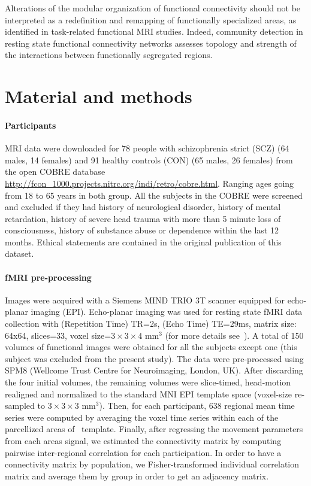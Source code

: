 Alterations of the modular organization of functional connectivity should not be interpreted as a redefinition and remapping of functionally specialized areas, as identified in task-related functional MRI studies.
Indeed, community detection in resting state functional connectivity networks assesses topology and strength of the interactions between functionally segregated regions.

\section{Material and methods}
\paragraph{Participants}

MRI data were downloaded for 78 people with schizophrenia strict (SCZ) (64 males, 14 females) and 91 healthy controls (CON) (65 males, 26 females) from the open COBRE database \url{http://fcon_1000.projects.nitrc.org/indi/retro/cobre.html}.
Ranging ages going from 18 to 65 years in both group.
All the subjects in the COBRE were screened and excluded if they had history of neurological disorder, history of mental retardation, history of severe head trauma with more than 5 minute loss of consciousness, history of substance abuse or dependence within the last 12 months.
Ethical statements are contained in the original publication of this dataset.

\paragraph{fMRI pre-processing}

Images were acquired with a Siemens MIND TRIO 3T scanner equipped for echo-planar imaging (EPI).
Echo-planar imaging was used for resting state fMRI data collection with (Repetition Time) TR=2s, (Echo Time) TE=29ms, matrix size: 64x64, slices=33, voxel size=$3 \times 3 \times 4$ mm$^3$ (for more details see~\cite{cetin2014}). A total of 150 volumes of functional images were obtained for all the subjects except one (this subject was excluded from the present study). The data were pre-processed using SPM8 (Wellcome Trust Centre for Neuroimaging, London, UK).
After discarding the four initial volumes, the remaining volumes were slice-timed, head-motion realigned and normalized to the standard MNI EPI template space (voxel-size re-sampled to $3 \times 3 \times 3$ mm$^3$).
Then, for each participant, 638 regional mean time series were computed by averaging the voxel time series within each of the parcellized areas of~\cite{crossley2013a} template. 
Finally, after regressing the movement parameters from each areas signal, we estimated the connectivity matrix by computing pairwise inter-regional correlation for each participation.
In order to have a connectivity matrix by population, we Fisher-transformed individual correlation matrix and average them by group in order to get an adjacency matrix.

